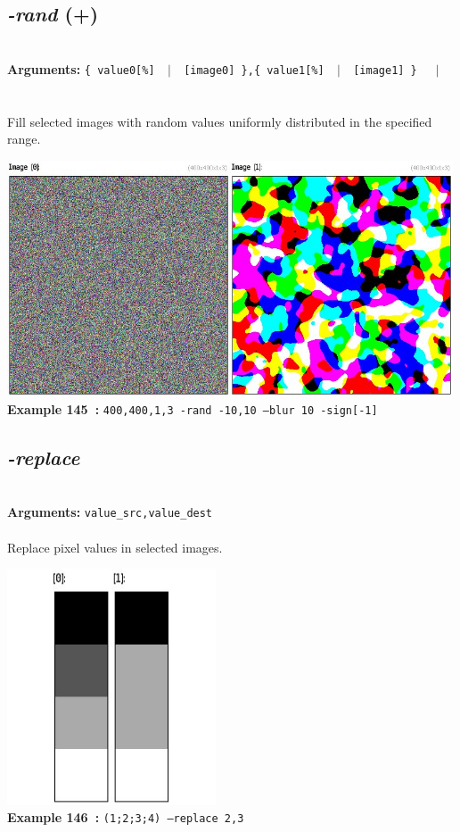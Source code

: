 \documentclass[a4paper,11pt,twoside]{book}
\begin{document}
\subsection{\emph{-rand} (+)}\vspace*{-0.5em}
~\\\textbf{Arguments: } 
{\small \texttt{\{ value0[\%] ~$|$~ [image0] \},\{ value1[\%] ~$|$~ [image1] \}}}~~~$|$\\
\hspace*{2.2cm}{\small \texttt{[image]}}\\~\\
Fill selected images with random values uniformly distributed in the specified range.
\begin{center}\includegraphics[keepaspectratio=true,height=7cm,width=\textwidth]{img/gmic_def145.jpg}\\
{\footnotesize \textbf{Example 145~:} \texttt{400,400,1,3 -rand -10,10 --blur 10 -sign[-1]}}
\end{center}

\subsection{\emph{-replace} }\vspace*{-0.5em}
~\\\textbf{Arguments: } 
{\small \texttt{value\_src,value\_dest}}\\~\\
Replace pixel values in selected images.
\begin{center}\includegraphics[keepaspectratio=true,height=7cm,width=\textwidth]{img/gmic_def146.jpg}\\
{\footnotesize \textbf{Example 146~:} \texttt{(1;2;3;4) --replace 2,3}}
\end{center}
\end{document}
